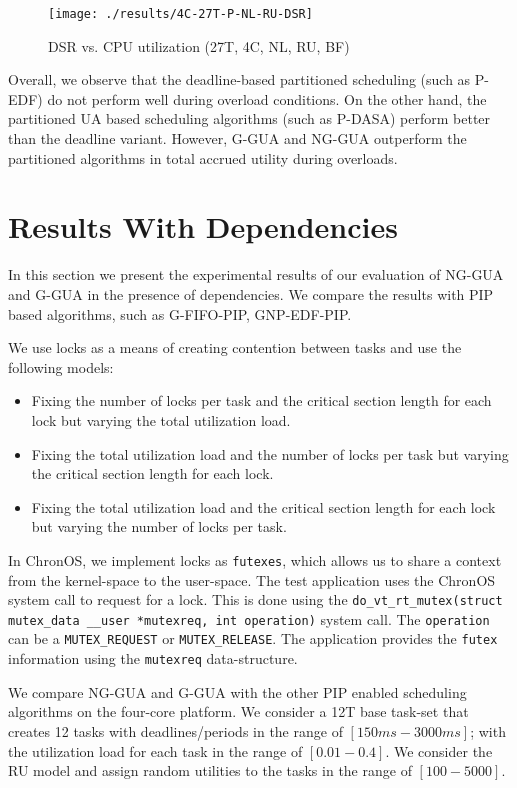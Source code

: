 \documentclass[12pt,dvips]{report}
\begin{document}
\begin{figure} [htbp]
  \centering
  \texttt{[image: ./results/4C-27T-P-NL-RU-DSR]}
  \caption{DSR vs. CPU utilization (27T, 4C, NL, RU, BF)}
\label{fig:4C-27T-P-NL-RU-DSR}
\end{figure}

Overall, we observe that the deadline-based partitioned scheduling (such as P-EDF) do not perform well during overload conditions. On the other hand, the partitioned UA based scheduling algorithms (such as P-DASA) perform better than the deadline variant. However, G-GUA and NG-GUA outperform the partitioned algorithms in total accrued utility during overloads.

\pagebreak
\section{Results With Dependencies}\label{sec:w-dep}

In this section we present the experimental results of our evaluation of NG-GUA and G-GUA in the presence of dependencies. We compare the results with PIP based algorithms, such as G-FIFO-PIP, GNP-EDF-PIP. 

We use locks as a means of creating contention between tasks and use the following models:
\begin{itemize}
	\item Fixing the number of locks per task and the critical section length for each lock but varying the total utilization load.
	\item Fixing the total utilization load and the number of locks per task but varying the critical section length for each lock.
	\item Fixing the total utilization load and the critical section length for each lock but varying the number of locks per task. 
\end{itemize}

In ChronOS, we implement locks as \texttt{futexes}, which allows us to share a context from the kernel-space to the user-space. The test application uses the ChronOS system call to request for a lock. This is done using the 
\texttt{do\_vt\_rt\_mutex(struct mutex\_data \_\_user *mutexreq, int operation)}
system call. The \texttt{operation} can be a \texttt{MUTEX\_REQUEST} or \texttt{MUTEX\_RELEASE}. The application provides the \texttt{futex} information using the \texttt{mutexreq} data-structure.

We compare NG-GUA and G-GUA with the other PIP enabled scheduling algorithms on the four-core platform. We consider a 12T base task-set that creates 12 tasks with deadlines/periods in the range of $[150ms - 3000ms]$; with the utilization load for each task in the range of $[0.01-0.4]$. We consider the RU model and assign random utilities to the tasks in the range of $[100-5000]$.
\end{document}
